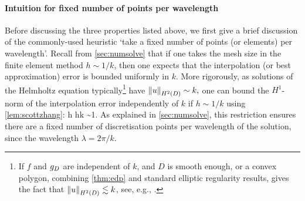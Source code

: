      

\paragraph{Intuition for fixed number of points per wavelength}\label{page:ppw} Before discussing the three properties listed above, we first give a brief discussion of the commonly-used heuristic `take a fixed number of points (or elements) per wavelength'.  Recall from \cref{sec:numsolve} that if one takes the mesh size in the finite element method $h \sim 1/k$, then one expects that the interpolation (or best approximation) error is bounded uniformly in $k$. More rigorously, as solutions of the Helmholtz equation typically\footnote{If $f$ and $g_{D}$ are independent of $k$, and $D$ is smooth enough, or a convex polygon, combining \cref{thm:edp} and standard elliptic regularity results, gives the fact that $\NHtD{u} \lesssim k$, see, e.g., \cite[Lemma 2.12]{GaGrSp:15}.} have $\NHtD{u} \sim k,$ one can bound the $H^1$-norm of the interpolation error independently of $k$ if $h \sim 1/k$ using \cref{lem:scottzhang}:
\beqs
{} \lesssim h  \lesssim hk \sim 1.
\eeqs  As explained in \cref{sec:numsolve}, this restriction ensures there are a fixed number of discretisation points per wavelength of the solution, since the wavelength $\lambda = 2\pi/k.$

